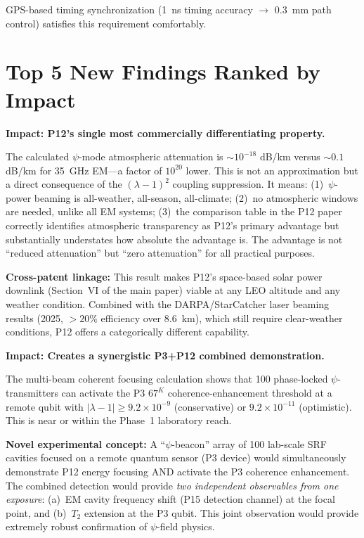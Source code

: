 \documentclass[aps,prd,twocolumn,superscriptaddress]{revtex4-2}
\begin{document}
GPS-based timing synchronization (1~ns timing accuracy $\rightarrow$
0.3~mm path control) satisfies this requirement comfortably.

\section{Top 5 New Findings Ranked by Impact}
\label{sec:top5}

\begin{tcolorbox}[colback=blue!5!white,colframe=blue!75!black,title=
{Finding \#1: Atmospheric Transparency 20 Orders Better than EM}]
\textbf{Impact: P12's single most commercially differentiating property.}

The calculated $\psi$-mode atmospheric attenuation is
$\sim 10^{-18}$ dB/km versus $\sim 0.1$ dB/km for 35~GHz EM---a
factor of $10^{20}$ lower.  This is not an approximation but a direct
consequence of the $(\lambda-1)^2$ coupling suppression.  It means:
(1)~$\psi$-power beaming is all-weather, all-season, all-climate;
(2)~no atmospheric windows are needed, unlike all EM systems; (3)~the
comparison table in the P12 paper correctly identifies atmospheric
transparency as P12's primary advantage but substantially understates
how absolute the advantage is.  The advantage is not ``reduced
attenuation'' but ``zero attenuation'' for all practical purposes.

\textbf{Cross-patent linkage:} This result makes P12's space-based
solar power downlink (Section~VI of the main paper) viable at any
LEO altitude and any weather condition.  Combined with the
DARPA/StarCatcher laser beaming results (2025, $>20\%$ efficiency over
8.6~km), which still require clear-weather conditions, P12 offers
a categorically different capability.
\end{tcolorbox}

\begin{tcolorbox}[colback=green!5!white,colframe=green!75!black,title=
{Finding \#2: 100-Beam Array Brings P3 Threshold Within Phase~1 Reach}]
\textbf{Impact: Creates a synergistic P3+P12 combined demonstration.}

The multi-beam coherent focusing calculation shows that 100 phase-locked
$\psi$-transmitters can activate the P3 $67^K$ coherence-enhancement
threshold at a remote qubit with $|\lambda-1| \geq 9.2\times10^{-9}$
(conservative) or $9.2\times10^{-11}$ (optimistic).  This is near
or within the Phase~1 laboratory reach.

\textbf{Novel experimental concept:} A ``$\psi$-beacon'' array of 100
lab-scale SRF cavities focused on a remote quantum sensor (P3 device)
would simultaneously demonstrate P12 energy focusing AND activate the
P3 coherence enhancement.  The combined detection would provide
\emph{two independent observables from one exposure}: (a)~EM cavity
frequency shift (P15 detection channel) at the focal point, and (b)~$T_2$
extension at the P3 qubit.  This joint observation would provide
extremely robust confirmation of $\psi$-field physics.
\end{tcolorbox}
\end{document}
